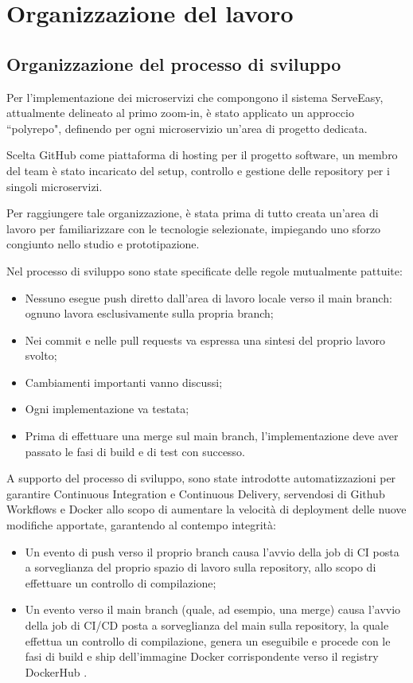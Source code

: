 \section{Organizzazione del lavoro}

\subsection{Organizzazione del processo di sviluppo}
Per l’implementazione dei microservizi che compongono il sistema ServeEasy, attualmente delineato al primo zoom-in, è stato applicato un approccio “polyrepo"\cite{polyrepo}, definendo per ogni microservizio un’area di progetto dedicata. 

Scelta GitHub come piattaforma di hosting per il progetto software, un membro del team è stato incaricato del setup, controllo e gestione delle repository per i singoli microservizi.

Per raggiungere tale organizzazione, è stata prima di tutto creata un’area di lavoro per familiarizzare con le tecnologie selezionate, impiegando uno sforzo congiunto nello studio e prototipazione.

Nel processo di sviluppo sono state specificate delle regole mutualmente pattuite:
\begin{itemize}
    \item Nessuno esegue push diretto dall’area di lavoro locale verso il main branch: ognuno lavora esclusivamente sulla propria branch;
    \item Nei commit e nelle pull requests va espressa una sintesi del proprio lavoro svolto;
\item Cambiamenti importanti vanno discussi;
\item Ogni implementazione va testata;
\item Prima di effettuare una merge sul main branch, l’implementazione deve aver passato le fasi di build e di test con successo.
\end{itemize}

A supporto del processo di sviluppo, sono state introdotte automatizzazioni per garantire Continuous Integration e Continuous Delivery, servendosi di Github Workflows e Docker allo scopo di aumentare la velocità di deployment delle nuove modifiche apportate, garantendo al contempo integrità:
\begin{itemize}
    \item Un evento di push verso il proprio branch causa l’avvio della job di CI posta a sorveglianza del proprio spazio di lavoro sulla repository, allo scopo di effettuare un controllo di compilazione;
    \item Un evento verso il main branch (quale, ad esempio, una merge) causa l’avvio della job di CI/CD posta a sorveglianza del main sulla repository, la quale effettua un controllo di compilazione, genera un eseguibile e procede con le fasi di build e ship dell'immagine Docker corrispondente verso il registry DockerHub \cite{DockerOverview}.
\end{itemize}

